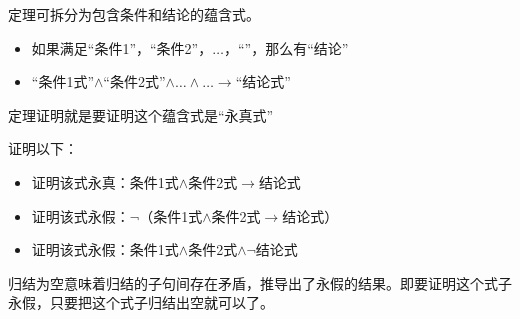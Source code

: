 \begin{note}
    定理可拆分为包含条件和结论的蕴含式。
    \begin{itemize}
        \item \textcolor{main1}{如果满足“条件1”，“条件2”，$\dots$，“”，那么有“结论”}
        \item \textcolor{main1}{“条件1式”$\land$“条件2式”$\land\dots\land\dots\to$“结论式”}
    \end{itemize}
    定理证明就是要证明这个蕴含式是“永真式”
\end{note}
\begin{theorem}[基于归结的定理证明]
    证明以下：
    \begin{itemize}
        \item \textcolor{main1}{证明该式永真}：条件1式$\land$条件2式$\to$结论式
        \item \textcolor{main1}{证明该式永假}：$\lnot$（条件1式$\land$条件2式$\to$结论式）
        \item \textcolor{main1}{证明该式永假}：条件1式$\land$条件2式$\land\lnot$结论式
    \end{itemize}
\end{theorem}
\begin{note}
    归结为空意味着归结的子句间存在矛盾，推导出了永假的结果。即要证明这个式子永假，只要把这个式子归结出空就可以了。
\end{note}
